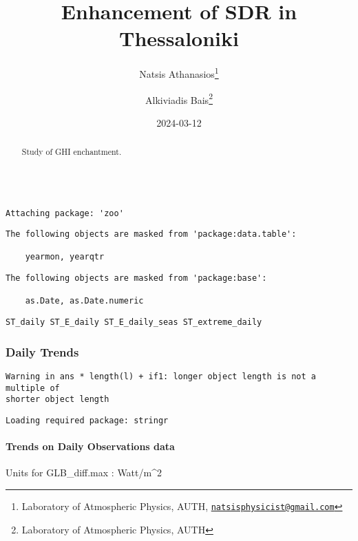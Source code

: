 \documentclass[
  10pt,
  a4paper,oneside]{article}
\title{Enhancement of SDR in Thessaloniki}
\author{Natsis Athanasios\footnote{Laboratory of Atmospheric Physics, AUTH, \href{mailto:natsisphysicist@gmail.com}{\nolinkurl{natsisphysicist@gmail.com}}} \and Alkiviadis Bais\footnote{Laboratory of Atmospheric Physics, AUTH}}
\date{2024-03-12}
\begin{document}
\maketitle
\begin{abstract}
Study of GHI enchantment.
\end{abstract}

{
\hypersetup{linkcolor=}
\setcounter{tocdepth}{4}
\tableofcontents
}
\begin{verbatim}

Attaching package: 'zoo'
\end{verbatim}

\begin{verbatim}
The following objects are masked from 'package:data.table':

    yearmon, yearqtr
\end{verbatim}

\begin{verbatim}
The following objects are masked from 'package:base':

    as.Date, as.Date.numeric
\end{verbatim}

\begin{verbatim}
ST_daily ST_E_daily ST_E_daily_seas ST_extreme_daily
\end{verbatim}

\newpage
\FloatBarrier

\hypertarget{daily-trends}{%
\subsubsection{Daily Trends}\label{daily-trends}}

\begin{verbatim}
Warning in ans * length(l) + if1: longer object length is not a multiple of
shorter object length
\end{verbatim}

\newpage

\begin{verbatim}
Loading required package: stringr
\end{verbatim}

\hypertarget{trends-on-daily-observations-data}{%
\paragraph{Trends on Daily Observations data}\label{trends-on-daily-observations-data}}

Units for GLB\_diff.max : Watt/m\^{}2
\end{document}
